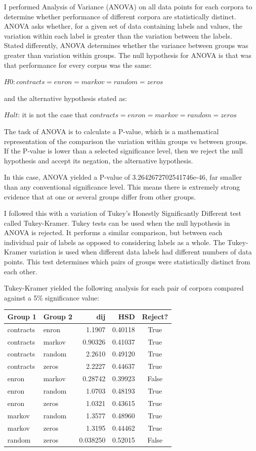 \documentclass[
]{article}
\newcounter{none} %
\begin{document}
I performed Analysis of Variance (ANOVA) on all data points for each
corpora to determine whether performance of different corpora are
statistically distinct. ANOVA asks whether, for a given set of data
containing labels and values, the variation within each label is greater
than the variation between the labels. Stated differently, ANOVA
determines whether the variance between groups was greater than
variation within groups. The null hypothesis for ANOVA is that was that
performance for every corpus was the same:

\(H0: contracts = enron = markov = random = zeros\)

and the alternative hypothesis stated as:

\(Halt\): it is not the case that
\(contracts = enron = markov = random = zeros\)

The task of ANOVA is to calculate a P-value, which is a mathematical
representation of the comparison the variation within groups vs between
groups. If the P-value is lower than a selected significance level, then
we reject the null hypothesis and accept its negation, the alternative
hypothesis.

In this case, ANOVA yielded a P-value of 3.2642672702541746e-46, far
smaller than any conventional significance level. This means there is
extremely strong evidence that at one or several groups differ from
other groups.

I followed this with a variation of Tukey's Honestly Significantly
Different test called Tukey-Kramer. Tukey tests can be used when the
null hypothesis in ANOVA is rejected. It performs a similar comparison,
but between each individual pair of labels as opposed to considering
labels as a whole. The Tukey-Kramer variation is used when different
data labels had different numbers of data points. This test determines
which pairs of groups were statistically distinct from each other.

Tukey-Kramer yielded the following analysis for each pair of corpora
compared against a 5\% significance value:

{\def\LTcaptype{none} %
\begin{longtable}[]{@{}llrrc@{}}
\toprule\noalign{}
Group 1 & Group 2 & dij & HSD & Reject? \\
\midrule\noalign{}
\endhead
\bottomrule\noalign{}
\endlastfoot
contracts & enron & 1.1907 & 0.40118 & True \\
contracts & markov & 0.90326 & 0.41037 & True \\
contracts & random & 2.2610 & 0.49120 & True \\
contracts & zeros & 2.2227 & 0.44637 & True \\
enron & markov & 0.28742 & 0.39923 & False \\
enron & random & 1.0703 & 0.48193 & True \\
enron & zeros & 1.0321 & 0.43615 & True \\
markov & random & 1.3577 & 0.48960 & True \\
markov & zeros & 1.3195 & 0.44462 & True \\
random & zeros & 0.038250 & 0.52015 & False \\
\end{longtable}
}
\end{document}
